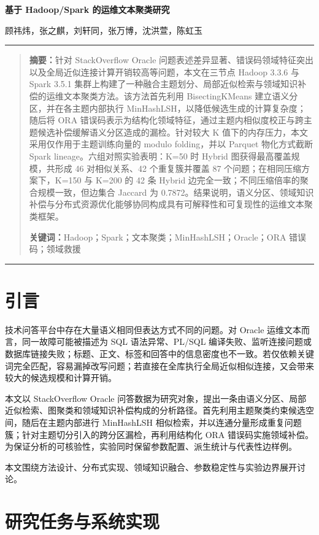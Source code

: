 \documentclass[a4paper,UTF8,zihao=5,fontset=windows]{ctexart}
\newenvironment{cnabstract}{\begin{quote}\zihao{-5}\setstretch{1.35}}{\end{quote}}
\newcommand{\maintitle}[1]{\begin{center}\zihao{2}\bfseries\heiti #1\end{center}}
\newcommand{\authorscn}[1]{\begin{center}\zihao{5}#1\end{center}}
\begin{document}
\maintitle{基于 Hadoop/Spark 的运维文本聚类研究}
\authorscn{顾祎炜，张之麒，刘轩同，张万博，沈洪萱，陈虹玉}


\vspace{0.6em}
\hrule
\begin{cnabstract}
\noindent\textbf{摘要：}针对 StackOverflow Oracle 问题表述差异显著、错误码领域特征突出以及全局近似连接计算开销较高等问题，本文在三节点 Hadoop 3.3.6 与 Spark 3.5.1 集群上构建了一种融合主题划分、局部近似检索与领域知识补偿的运维文本聚类方法。该方法首先利用 BisectingKMeans 建立语义分区，并在各主题内部执行 MinHashLSH，以降低候选生成的计算复杂度；随后将 ORA 错误码表示为结构化领域特征，通过主题内相似度校正与跨主题候选补偿缓解语义分区造成的漏检。针对较大 K 值下的内存压力，本文采用仅作用于主题训练向量的 modulo folding，并以 Parquet 物化方式截断 Spark lineage。六组对照实验表明：K=50 时 Hybrid 图获得最高覆盖规模，共形成 46 对相似关系、42 个重复簇并覆盖 87 个问题；在相同压缩方案下，K=150 与 K=200 的 42 条 Hybrid 边完全一致；不同压缩倍率的聚合规模一致，但边集合 Jaccard 为 0.7872。结果说明，语义分区、领域知识补偿与分布式资源优化能够协同构成具有可解释性和可复现性的运维文本聚类框架。

\noindent\textbf{关键词：}Hadoop；Spark；文本聚类；MinHashLSH；Oracle；ORA 错误码；领域救援
\end{cnabstract}
\hrule
\vspace{0.8em}

\section{引言}

技术问答平台中存在大量语义相同但表达方式不同的问题。对 Oracle 运维文本而言，同一故障可能被描述为 SQL 语法异常、PL/SQL 编译失败、监听连接问题或数据库链接失败；标题、正文、标签和回答中的信息密度也不一致。若仅依赖关键词完全匹配，容易漏掉改写问题；若直接在全库执行全局近似相似连接，又会带来较大的候选规模和计算开销。

本文以 StackOverflow Oracle 问答数据为研究对象，提出一条由语义分区、局部近似检索、图聚类和领域知识补偿构成的分析路径。首先利用主题聚类约束候选空间，随后在主题内部进行 MinHashLSH 相似检索，并以连通分量形成重复问题簇；针对主题切分引入的跨分区漏检，再利用结构化 ORA 错误码实施领域补偿。为保证分析的可核验性，实验同时保留参数配置、派生统计与代表性边样例。

本文围绕方法设计、分布式实现、领域知识融合、参数稳定性与实验边界展开讨论。

\section{研究任务与系统实现}
\end{document}
